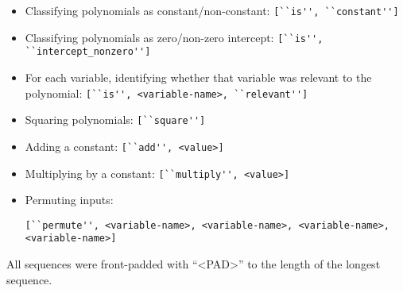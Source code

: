 \begin{itemize}
\item Classifying polynomials as constant/non-constant: \verb|[``is'', ``constant'']|
\item Classifying polynomials as zero/non-zero intercept: \verb|[``is'', ``intercept_nonzero'']|
\item For each variable, identifying whether that variable was relevant to the polynomial: \verb|[``is'', <variable-name>, ``relevant'']|
\item Squaring polynomials: \verb|[``square'']|
\item Adding a constant: \verb|[``add'', <value>]|
\item Multiplying by a constant: \verb|[``multiply'', <value>]|
\item Permuting inputs: 
\begin{verbatim}[``permute'', <variable-name>, <variable-name>, <variable-name>, 
<variable-name>]\end{verbatim}
\end{itemize}
All sequences were front-padded with ``<PAD>'' to the length of the longest sequence.

